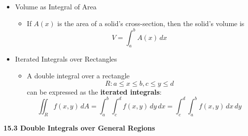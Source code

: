 \documentclass[12pt]{article}
\newcommand{\dvar}[1]{\,d{#1}}
\renewcommand{\d}[1]{\dvar{#1}}
\newcommand{\<}{\left<}
\renewcommand{\>}{\right>}
\begin{document}
  \begin{itemize}

  \item Volume as Integral of Area

    \begin{itemize}
    \item If $A(x)$ is the area of a solid's cross-section, then the solid's volume is
      \[
        V  = \int_a^b A(x)\d{x}
      \]
    \end{itemize}
  
  \item Iterated Integrals over Rectangles
  
    \begin{itemize}
    \item A double integral over a rectangle
      \[
        R: a\leq x\leq b, c\leq y\leq d
      \]
        can be expressed as the \textbf{iterated integrals}:
      \[
        \iint_R f(x,y)\d{A} = \int_a^b\int_c^d f(x,y)\d{y}\d{x} = \int_c^d\int_a^b f(x,y)\d{x}\d{y}
      \]
    \end{itemize}
    
  
    
  \end{itemize}
  
  \newpage
  
  \centerline{\bf 15.3 Double Integrals over General Regions}
  
\end{document}
